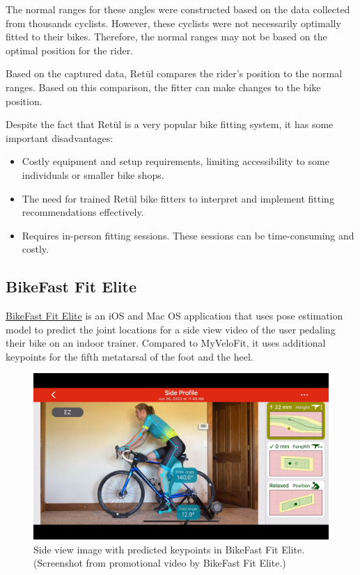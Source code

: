 The normal ranges for these angles were constructed based on the data collected from thousands cyclists. However, these cyclists were not necessarily optimally fitted to their bikes. Therefore, the normal ranges may not be based on the optimal position for the rider.

Based on the captured data, Retül compares the rider's position to the normal ranges. Based on this comparison, the fitter can make changes to the bike position.

Despite the fact that Retül is a very popular bike fitting system, it has some important disadvantages:
\begin{itemize}
    \item Costly equipment and setup requirements, limiting accessibility to some individuals or smaller bike shops.
    \item The need for trained Retül bike fitters to interpret and implement fitting recommendations effectively.
    \item Requires in-person fitting sessions. These sessions can be time-consuming and costly.
\end{itemize}


\subsection{BikeFast Fit Elite}
\href{https://www.bikefastfit.com/}{BikeFast Fit Elite} is an iOS and Mac OS application that uses pose estimation model to predict the joint locations for a side view video of the user pedaling their bike on an indoor trainer. Compared to MyVeloFit, it uses additional keypoints for the fifth metatarsal of the foot and the heel.

\begin{figure}[htbp]
    \centering
    \includegraphics[width=\textwidth]{obrazky-figures/bike_fast_fit_elite.png}
    \caption{Side view image with predicted keypoints in BikeFast Fit Elite. (Screenshot from promotional video \cite{bikeFastFitElitev2Youtube} by BikeFast Fit Elite.)}
    \label{fig:bikefastfit_keypoints}
\end{figure}

